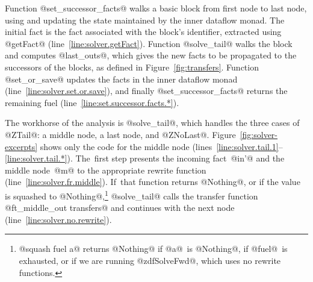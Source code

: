 \documentclass[blockstyle,preprint,natbib,nocopyrightspace]{sigplanconf}
\newcommand\lineref[1]{line~\ref{line:#1}}
\newcommand\linerangeref[2]{\mbox{lines~\ref{line:#1}--\ref{line:#2}}}
\newcommand{\authornote}[1]{{\em #1}}
\def\authornote#1{\unskip\relax}
\newcommand{\john}[1]{\authornote{JD: #1}}
\newcommand\figref[1]{Figure~\ref{fig:#1}}
\begin{document}
Function @set_successor_facts@ walks a basic block from first node to
last node, using and updating the state maintained by
the inner dataflow monad.
The initial fact is the fact associated with the block's identifier,
extracted using @getFact@ (\lineref{solver.getFact}).
Function @solve_tail@ walks the block and computes @last_outs@, which
gives the new facts to be propagated to the successors of the blocks,
as defined in \figref{transfers}.
Function @set_or_save@ updates the facts in the inner dataflow monad
(\lineref{solver.set.or.save}), 
and finally @set_successor_facts@ returns the remaining fuel
(\lineref{set.successor.facts.*}). 
\john{If we need space, this paragraph is very heavy for its payload.}

The workhorse of the analysis is @solve_tail@, which handles the three
cases of @ZTail@: a middle node, a last node, and @ZNoLast@.
\figref{solver-excerpts} shows only the code for the middle node
(\linerangeref{solver.tail.1}{solver.tail.*}).
The~first step presents the incoming fact~@in'@ and the middle
node~@m@ to the appropriate rewrite function (\lineref{solver.fr.middle}).
If~that function returns @Nothing@, or if the value is squashed to
@Nothing@,\footnote
{@squash fuel a@ returns @Nothing@ if @a@~is @Nothing@, if @fuel@~is
  exhausted, or if we are running @zdfSolveFwd@, which uses no rewrite
  functions.
}
@solve_tail@
calls the transfer function
@ft_middle_out transfers@ and continues with the next node
(\lineref{solver.no.rewrite}). 
\end{document}
